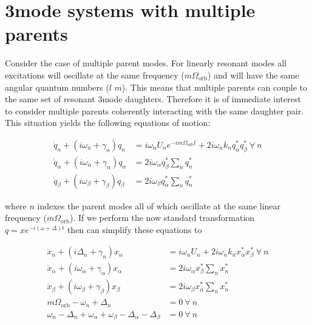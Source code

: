 \section*{3mode systems with multiple parents}

Consider the case of multiple parent modes. For linearly resonant modes  all excitations will oscillate at the same frequency ($m\Omega_{\mathrm{orb}}$)  and will have the same angular quantum numbers ($l$ $m$). This means that multiple parents can couple to the same set of resonant 3mode daughters. Therefore  it is of immediate interest to consider multiple parents coherently interacting with the same daughter pair. This situation yields the following equations of motion:

\begin{subequations}
\begin{align}
\dot{q}_n + (i\omega_n+ \gamma_n) q_n & = i\omega_n U_n e^{-i m \Omega_\mathrm{orb} t} + 2i\omega_n k_n q_\alpha^\ast q_\beta^\ast \  \forall\  n \\
\dot{q}_\alpha + (i\omega_\alpha+\gamma_\alpha)q_\alpha & = 2i\omega_\alpha q_\beta^\ast \sum\limits_{n} q_n^\ast \\
\dot{q}_\beta + (i\omega_\beta+\gamma_\beta)q_\beta & = 2i\omega_\beta q_\alpha^\ast \sum\limits_{n} q_n^\ast 
\end{align}
\end{subequations}

where $n$ indexes the parent modes  all of which oscillate at the same linear frequency ($m\Omega_\mathrm{orb}$). If we perform the now standard transformation $q=x e^{-i(\omega+\Delta)t}$  then can simplify these equations to 

\begin{subequations}
\begin{align}
\dot{x}_n + (i\Delta_n+\gamma_n)x_n & = i\omega_n U_n + 2i\omega_n k_n x_\alpha^\ast x_\beta^\ast \  \forall\  n \\
\dot{x}_\alpha + (i\omega_\alpha+\gamma_\alpha)x_\alpha & = 2i\omega_\alpha x_\beta^\ast \sum\limits_{n} x_n^\ast \\
\dot{x}_\beta + (i\omega_\beta+\gamma_\beta)x_\beta & = 2i\omega_\beta x_\alpha^\ast \sum\limits_{n} x_n^\ast \\
m\Omega_\mathrm{orb} - \omega_n + \Delta_n & = 0\  \forall\  n\\
\omega_n - \Delta_n + \omega_\alpha + \omega_\beta - \Delta_\alpha -\Delta_\beta & = 0 \  \forall\  n
\end{align}
\end{subequations}

